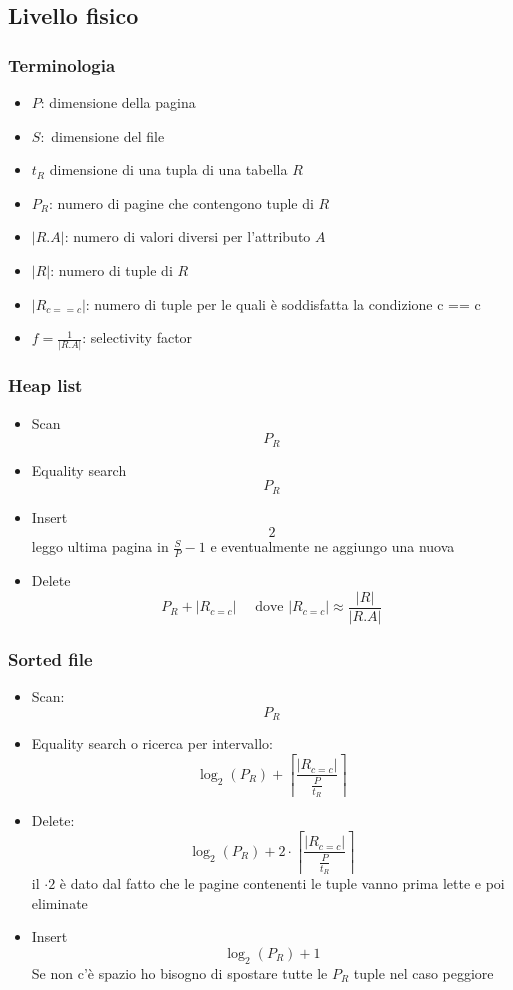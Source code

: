 \subsection{Livello fisico}
\subsubsection*{Terminologia}
\begin{itemize}
	\item $ P $: dimensione della pagina
	\item $ S: $ dimensione del file
	\item $ t_R $ dimensione di una tupla di una tabella $ R $
	\item $ P_R $: numero di pagine che contengono tuple di $ R $
	\item $ \left|R.A\right| $: numero di valori diversi per l'attributo $ A $
	\item $ \left|R\right| $: numero di tuple di $ R $
	\item $ \left|R_{c==c}\right| $: numero di tuple per le quali è soddisfatta la condizione c == c
	\item $ f= \frac{1}{\left|R.A\right|} $: selectivity factor
\end{itemize}

\subsubsection*{Heap list}
\begin{itemize}
	\item Scan
	      \[
		      P_R
	      \]
	\item Equality search
	      \[
		      P_R
	      \]
	\item Insert
	      \[
		      2
	      \]
	      leggo ultima pagina in $ \frac{S}{P}-1 $ e eventualmente ne aggiungo una nuova
	\item Delete
	      \[
		      P_R + \left|R_{c=c}\right| \quad \text{ dove } \left|R_{c=c}\right| \approx \frac{\left|R\right|}{\left|R.A\right|}
	      \]
\end{itemize}

\subsubsection*{Sorted file}
\begin{itemize}
	\item Scan:
	      \[
		      P_R
	      \]
	\item Equality search o ricerca per intervallo:
	      \[
		      \log_2\left(P_R\right) + \left\lceil \frac{\left|R_{c=c}\right|}{\frac{P}{t_R}} \right\rceil
	      \]
	\item Delete:
	      \[
		      \log_2\left(P_R\right) + 2 \cdot \left\lceil \frac{\left|R_{c=c}\right|}{\frac{P}{t_R}} \right\rceil
	      \]
	      il $ \cdot 2 $ è dato dal fatto che le pagine contenenti le tuple vanno prima lette e poi eliminate
	\item Insert
	      \[
		      \log_2\left(P_R\right) + 1
	      \]
	      Se non c'è spazio ho bisogno di spostare tutte le $ P_R $ tuple nel caso peggiore
\end{itemize}

